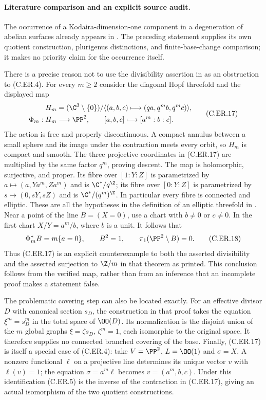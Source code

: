 \paragraph{Literature comparison and an explicit source audit.}
The occurrence of a Kodaira-dimension-one component in a degeneration
of abelian surfaces already appears in
\cite[Example~3.4(1), p.~99]{Fujimoto1988Log}.
The preceding statement supplies its own quotient construction,
plurigenus distinctions, and finite-base-change comparison; it makes
no priority claim for the occurrence itself.

There is a precise reason not to use the divisibility assertion in
\cite[Theorem~2.8 and Corollary~2.10, pp.~96--97]{Fujimoto1988Log}
as an obstruction to (C.ER.4). For every $m\ge2$ consider the
diagonal Hopf threefold and the displayed map
\[
 \begin{split}
 H_m&=(\C^3\setminus\{0\})/
       \langle(a,b,c)\longmapsto(qa,q^m b,q^m c)\rangle,\\
 \Phi_m:H_m&\longrightarrow\PP^2,
       \qquad[a,b,c]\longmapsto[a^m:b:c].
 \end{split}                                             \tag{C.ER.17}
\]
The action is free and properly discontinuous. A compact annulus
between a small sphere and its image under the contraction meets every
orbit, so $H_m$ is compact and smooth. The three projective coordinates
in (C.ER.17) are multiplied by the same factor $q^m$, proving descent.
The map is holomorphic, surjective, and proper. Its fibre over
$[1:Y:Z]$ is parametrized by
$a\mapsto(a,Ya^m,Za^m)$ and is $\C^*/q^{\Z}$; its fibre over
$[0:Y:Z]$ is parametrized by
$s\mapsto(0,sY,sZ)$ and is $\C^*/(q^m)^{\Z}$.
In particular every fibre is connected and elliptic. These are all
the hypotheses in the definition of an elliptic threefold in
\cite[pp.~91--92]{Fujimoto1988Log}.
Near a point of the line $B=(X=0)$, use a chart with $b\ne0$ or
$c\ne0$. In the first chart $X/Y=a^m/b$, where $b$ is a unit.
It follows that
\[
             \Phi_m^*B=m\{a=0\},\qquad B^2=1,
             \qquad\pi_1(\PP^2\setminus B)=0.             \tag{C.ER.18}
\]
Thus (C.ER.17) is an explicit counterexample to both the asserted
divisibility and the asserted surjection to $\Z/m$ in that theorem
as printed. This conclusion follows from the verified map, rather
than from an inference that an incomplete proof makes a statement
false.

The problematic covering step can also be located exactly. For an
effective divisor $D$ with canonical section $s_D$, the construction
in that proof takes the equation $\xi^m=s_D^m$ in the total space of
$\OO(D)$. Its normalization is the disjoint union of the $m$ global
graphs $\xi=\zeta s_D$, $\zeta^m=1$, each isomorphic to the original
space. It therefore supplies no connected branched covering of the
base. Finally, (C.ER.17) is itself a special case of (C.ER.4): take
$V=\PP^2$, $L=\OO(1)$ and $\sigma=X$. A nonzero functional
$\ell$ on a projective line determines its unique vector $v$ with
$\ell(v)=1$; the equation $\sigma=a^m\ell$ becomes
$v=(a^m,b,c)$. Under this identification (C.ER.5) is the inverse
of the contraction in (C.ER.17), giving an actual isomorphism of
the two quotient constructions.
